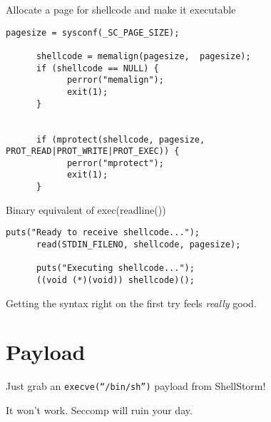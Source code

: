 \documentclass{beamer}
\begin{document}
\begin{frame}[fragile]
 Allocate a page for shellcode and make it executable
    \begin{lstlisting}[firstnumber=50]
      pagesize = sysconf(_SC_PAGE_SIZE);

      shellcode = memalign(pagesize,  pagesize);
      if (shellcode == NULL) {
            perror("memalign");
            exit(1);
      }


      if (mprotect(shellcode, pagesize, PROT_READ|PROT_WRITE|PROT_EXEC)) {
            perror("mprotect");
            exit(1);
      }
    \end{lstlisting}
\end{frame}

\begin{frame}[fragile]
 Binary equivalent of exec(readline())
 \begin{lstlisting}[firstnumber=34]
      puts("Ready to receive shellcode...");
      read(STDIN_FILENO, shellcode, pagesize);

      puts("Executing shellcode...");
      ((void (*)(void)) shellcode)();
 \end{lstlisting}

 \pause Getting the syntax right on the first try feels {\it really} good.
\end{frame}

\section{Payload}

\begin{frame}[fragile]
Just grab an {\tt execve(``/bin/sh'')} payload from ShellStorm!

\pause It won't work.
\pause Seccomp will ruin your day.
 
\end{frame}
\end{document}
